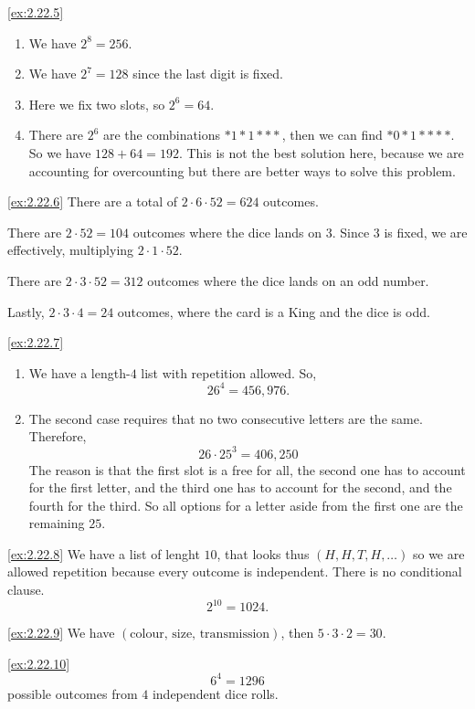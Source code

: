 \begin{solution}\label{sol:2.22.5}\ref{ex:2.22.5}
    \begin{enumerate}
        \item We have $2^{8}=256$.
        \item We have $2^{7}=128$ since the last digit is fixed. 
        \item Here we fix two slots, so $2^{6}=64$.
        \item There are $2^{6}$ are the combinations $*1*1***$, then we can find $*0*1****$. So we have $128+64=192$. This is not the best solution here, because we are accounting for overcounting but there are better ways to solve this problem. 
    \end{enumerate}
\end{solution}

\begin{solution}\label{sol:2.22.6}\ref{ex:2.22.6}
    There are a total of $2\cdot 6\cdot 52 = 624$ outcomes. 
    
    There are $2\cdot 52=104$ outcomes where the dice lands on $3$. Since $3$ is fixed, we are effectively, multiplying $2\cdot 1\cdot 52$.

    There are $2\cdot 3\cdot 52= 312$ outcomes where the dice lands on an odd number. 

    Lastly, $2\cdot 3\cdot 4 = 24$ outcomes, where the card is a King and the dice is odd.  
\end{solution}

\begin{solution}\label{sol:2.22.7}\ref{ex:2.22.7}
    \begin{enumerate}
        \item We have a length-$4$ list with repetition allowed. So, 
        $$
        26^{4}=456,976.
        $$
        \item The second case requires that no two consecutive letters are the same. Therefore, 
        $$
        26\cdot 25^{3}=406,250
        $$
        The reason is that the first slot is a free for all, the second one has to account for the first letter, and the third one has to account for the second, and the fourth for the third. So all options for a letter aside from the first one are the remaining $25$.
    \end{enumerate}
\end{solution}

\begin{solution}\label{sol:2.22.8}\ref{ex:2.22.8}
    We have a list of lenght $10$, that looks thus $(H,H,T,H,\dots)$ so we are allowed repetition because every outcome is independent. There is no conditional clause. 
    $$
    2^{10}=1024.
    $$
\end{solution}

\begin{solution}\label{sol:2.22.9}\ref{ex:2.22.9}
    We have $(\text{colour, size, transmission})$, then $5\cdot 3 \cdot 2=30$. 
\end{solution}

\begin{solution}\label{sol:2.22.10}\ref{ex:2.22.10}
    $$
    6^{4}=1296
    $$
    possible outcomes from $4$ independent dice rolls. 
\end{solution}